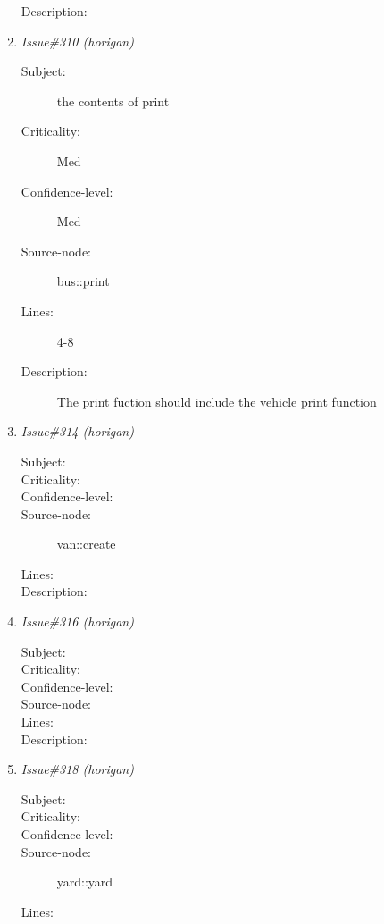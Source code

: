 \begin{enumerate}
\begin{description}
\item [Description:] 
\end{description}
\item {\it Issue\#310 (horigan)}
\begin{description}
\item [Subject:] the contents of print
\item [Criticality:] Med
\item [Confidence-level:] Med
\item [Source-node:] bus::print

\item [Lines:] 4-8

\item [Description:] The print fuction should include the vehicle
print function
\end{description}
\item {\it Issue\#314 (horigan)}
\begin{description}
\item [Subject:] 
\item [Criticality:] 
\item [Confidence-level:] 
\item [Source-node:] van::create

\item [Lines:] 

\item [Description:] 
\end{description}
\item {\it Issue\#316 (horigan)}
\begin{description}
\item [Subject:] 
\item [Criticality:] 
\item [Confidence-level:] 
\item [Source-node:] 

\item [Lines:] 

\item [Description:] 
\end{description}
\item {\it Issue\#318 (horigan)}
\begin{description}
\item [Subject:] 
\item [Criticality:] 
\item [Confidence-level:] 
\item [Source-node:] yard::yard

\item [Lines:] 


\end{description}
\end{enumerate}
